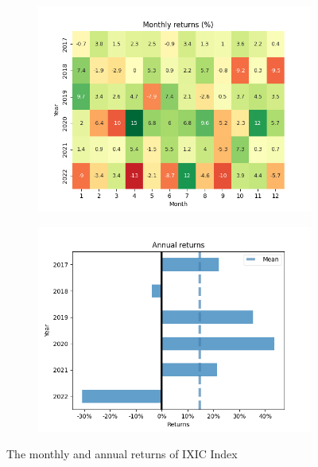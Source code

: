 \documentclass[../xlapes02]{subfiles}
\begin{document}
    \begin{figure}[H]
        \centering
        \begin{subfigure}[t]{\experimentimgwidth\textwidth}
            \centering
            \includegraphics[width=\linewidth]{image/figure/monthly_returns_heatmap_ixic}
        \end{subfigure}
        \hfill
        \begin{subfigure}[t]{\experimentimgwidth\textwidth}
            \centering
            \includegraphics[width=\linewidth]{image/figure/annual_returns_ixic}
        \end{subfigure}
        \caption{The monthly and annual returns of IXIC Index}
        \label{fig:month_annual_returns_ixic}
    \end{figure}
\end{document}
